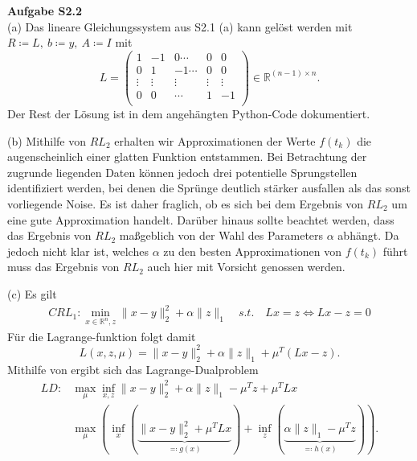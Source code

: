 \documentclass[ngerman, a4paper,12pt]{article}
\begin{document}
\par
\textbf{Aufgabe S2.2} \\
(a) Das lineare Gleichungssystem aus S2.1 (a) kann gelöst werden mit $R \coloneqq L, \ b \coloneqq y, \ A \coloneqq I$ mit
\begin{equation*}
	L = \begin{pmatrix}
	1 &-1 & 0 \cdots &0 &0\\
	0 & 1 & -1 \cdots &0 &0\\
	\vdots & \vdots & \vdots & \vdots & \vdots \\
	0 & 0 & \cdots & 1 & -1\\ 
	\end{pmatrix} \in \mathbb R^{(n-1)\times n}.
\end{equation*}
Der Rest der Lösung ist in dem angehängten Python-Code dokumentiert.
\par
(b) %
Mithilfe von $RL_2$ erhalten wir Approximationen der Werte $f(t_k)$ die augenscheinlich einer glatten Funktion entstammen. Bei Betrachtung der zugrunde liegenden Daten können jedoch drei potentielle Sprungstellen identifiziert werden, bei denen die Sprünge deutlich stärker ausfallen als das sonst vorliegende Noise. Es ist daher fraglich, ob es sich bei dem Ergebnis von $RL_2$ um eine gute Approximation handelt. Darüber hinaus sollte beachtet werden, dass das Ergebnis von $RL_2$ maßgeblich von der Wahl des Parameters $\alpha$ abhängt. Da jedoch nicht klar ist, welches $\alpha$ zu den besten Approximationen von $f(t_k)$ führt muss das Ergebnis von $RL_2$ auch hier mit Vorsicht genossen werden.
\par
(c) Es gilt
\begin{equation*}
	\begin{split}
	CRL_1: \min_{x\in\mathbb R^n,z}\|x-y\|_2^2+\alpha\|z\|_1 \quad s.t. \quad Lx = z \Leftrightarrow Lx - z=0
	\end{split}
\end{equation*}
Für die Lagrange-funktion folgt damit
\begin{equation}
\label{eq:lagrange}
L(x,z,\mu)=\|x-y\|_2^2+\alpha \|z\|_1+\mu^T(Lx - z).
\end{equation}
Mithilfe von  ergibt sich das Lagrange-Dualproblem
\begin{equation*}
	\begin{split}
	LD: &\max_{\mu} \inf_{x,z} \|x-y\|_2^2+\alpha\|z\|_1 - \mu^Tz + \mu^TLx \\
			&\max_{\mu} \left( \inf_{x} \left( \underbrace{\|x-y\|_2^2 + \mu^TLx}_{\eqqcolon g(x)}  \right) + \inf_{z} \left( 
			\underbrace{\alpha\|z\|_1 - \mu^Tz}_{\eqqcolon h(x)}  \right) \right).
	\end{split}
\end{equation*}
\end{document}
